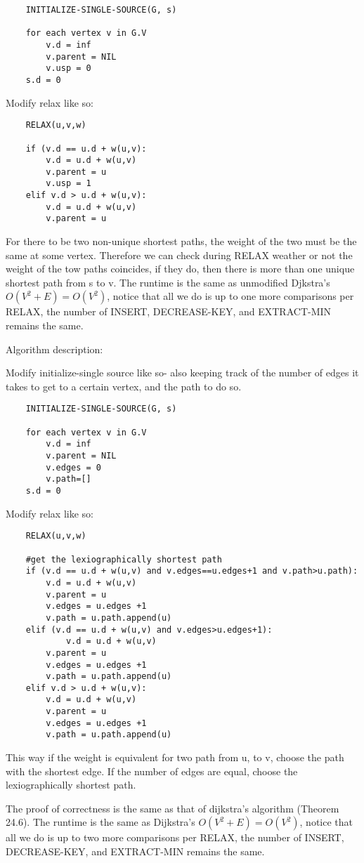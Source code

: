 \documentclass[12pt]{article}
\newenvironment{question}[2][Question]{\begin{trivlist}
		\item[\hskip \labelsep {\bfseries #1}\hskip \labelsep {\bfseries #2.}]}{\end{trivlist}}
\begin{document}
\begin{question}{4}

	\begin{lstlisting}
	INITIALIZE-SINGLE-SOURCE(G, s)
	
	for each vertex v in G.V
		v.d = inf
		v.parent = NIL
		v.usp = 0
	s.d = 0	
	\end{lstlisting}
	
		Modify relax like so:
	\begin{lstlisting}
	RELAX(u,v,w)
		
	if (v.d == u.d + w(u,v):
		v.d = u.d + w(u,v)
		v.parent = u
		v.usp = 1
	elif v.d > u.d + w(u,v):
		v.d = u.d + w(u,v)
		v.parent = u	
	\end{lstlisting}
	
	For there to be two non-unique shortest paths, the weight of the two must be the same at some vertex. Therefore we can check during RELAX weather or not the weight of the tow paths coincides, if they do, then there is more than one unique shortest path from s to v.
	The runtime is the same as unmodified Djkstra's $O(V^2 + E) = O(V^2)$, notice that all we do is up to one more comparisons per RELAX, the number of INSERT, DECREASE-KEY, and EXTRACT-MIN remains the same.
\end{question}

\begin{question}{5}

	Algorithm description:
	
	Modify initialize-single source like so- also keeping track of the number of edges it takes to get to a certain vertex, and the path to do so.
	\begin{lstlisting}
	INITIALIZE-SINGLE-SOURCE(G, s)
	
	for each vertex v in G.V
		v.d = inf
		v.parent = NIL
		v.edges = 0
		v.path=[]
	s.d = 0	
	\end{lstlisting}
	
	Modify relax like so:
		\begin{lstlisting}
	RELAX(u,v,w)
	
	#get the lexiographically shortest path
	if (v.d == u.d + w(u,v) and v.edges==u.edges+1 and v.path>u.path):
		v.d = u.d + w(u,v)
		v.parent = u
		v.edges = u.edges +1
		v.path = u.path.append(u)
	elif (v.d == u.d + w(u,v) and v.edges>u.edges+1):
			v.d = u.d + w(u,v)
		v.parent = u
		v.edges = u.edges +1
		v.path = u.path.append(u)
	elif v.d > u.d + w(u,v):
		v.d = u.d + w(u,v)
		v.parent = u
		v.edges = u.edges +1
		v.path = u.path.append(u)
	\end{lstlisting}
	This way if the weight is equivalent for two path from u, to v, choose the path with the shortest edge. If the number of edges are equal, choose the lexiographically shortest path.
	
	The proof of correctness is the same as that of dijkstra's algorithm (Theorem 24.6). The runtime is the same as Dijkstra's $O(V^2 + E) = O(V^2)$, notice that all we do is up to two more comparisons per RELAX, the number of INSERT, DECREASE-KEY, and EXTRACT-MIN remains the same.
	
	
	
\end{question}
	\clearpage
	
	
	
\end{document}
